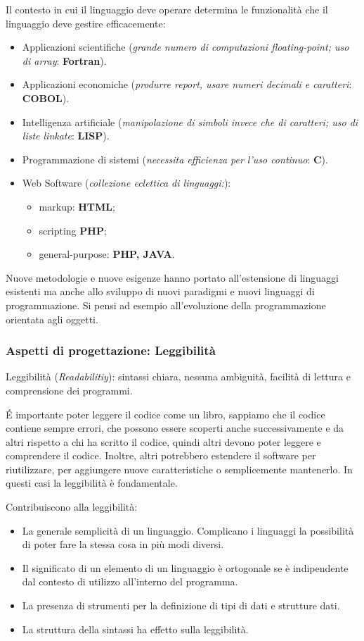 \documentclass[oneside,a4paper,11pt]{book}
\theoremstyle{italicstyle}
\theoremstyle{normStyle}
\begin{document}
Il contesto in cui il linguaggio deve operare determina le funzionalità che il 
linguaggio deve gestire efficacemente:
\begin{itemize}
  \item Applicazioni scientifiche (\textit{grande numero di computazioni 
  floating-point; uso di array}: \textbf{Fortran}).
  \item Applicazioni economiche (\textit{produrre report, usare numeri 
  decimali e caratteri}: \textbf{COBOL}).
  \item Intelligenza artificiale (\textit{manipolazione di simboli 
  invece che di caratteri; uso di liste linkate}: \textbf{LISP}).
  \item Programmazione di sistemi (\textit{necessita efficienza per l'uso 
  continuo}: \textbf{C}).
  \item Web Software (\textit{collezione eclettica di linguaggi:}):
  \begin{itemize}
    \item markup: \textbf{HTML};
    \item scripting \textbf{PHP};
    \item general-purpose: \textbf{PHP, JAVA}.
  \end{itemize}
\end{itemize}
Nuove metodologie e nuove esigenze hanno portato all'estensione di 
linguaggi esistenti ma anche allo sviluppo di nuovi paradigmi e nuovi 
linguaggi di programmazione. Si pensi ad esempio all'evoluzione della 
programmazione orientata agli oggetti.
\subsubsection{Aspetti di progettazione: Leggibilità}
\begin{tcolorbox}
Leggibilità (\textit{Readabilitiy}): sintassi chiara, nessuna ambiguità, 
facilità di lettura e comprensione dei programmi.
\end{tcolorbox}
É importante poter leggere il codice come un libro, sappiamo che il codice 
contiene sempre errori, che possono essere scoperti anche successivamente e 
da altri rispetto a chi ha scritto il codice, quindi altri devono poter 
leggere e comprendere il codice. Inoltre, altri potrebbero estendere il 
software per riutilizzare, per aggiungere nuove caratteristiche o semplicemente 
mantenerlo.
In questi casi la leggibilità è fondamentale.

Contribuiscono alla leggibilità:
\begin{itemize}
  \item La generale semplicità di un linguaggio. Complicano i linguaggi 
  la possibilità di poter fare la stessa cosa in più modi diversi.
  \item Il significato di un elemento di un linguaggio è ortogonale 
  se è indipendente dal contesto di utilizzo all'interno del programma.
  \item  La presenza di strumenti per la definizione di tipi di dati e 
  strutture dati.
  \item La struttura della sintassi ha effetto sulla leggibilità.
\end{itemize}
\end{document}
